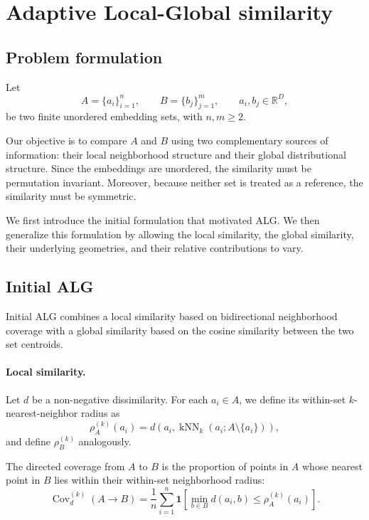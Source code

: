 \documentclass[preprint,12pt]{elsarticle}
\newcommand{\Cov}{\operatorname{Cov}}
\newcommand{\R}{\mathbb{R}}
\newcommand{\ind}{\mathbf{1}}
\begin{document}
\section{Adaptive Local-Global similarity}
\label{sec:method}

\subsection{Problem formulation}

Let
\[
    A=\{a_i\}_{i=1}^{n},
    \qquad
    B=\{b_j\}_{j=1}^{m},
    \qquad
    a_i,b_j\in\R^D,
\]
be two finite unordered embedding sets, with $n,m\geq2$.

Our objective is to compare $A$ and $B$ using two complementary sources of
information: their local neighborhood structure and their global
distributional structure. Since the embeddings are unordered, the similarity
must be permutation invariant. Moreover, because neither set is treated as a
reference, the similarity must be symmetric.

We first introduce the initial formulation that motivated ALG. We then
generalize this formulation by allowing the local similarity, the global
similarity, their underlying geometries, and their relative contributions to
vary.

\subsection{Initial ALG}

Initial ALG combines a local similarity based on bidirectional neighborhood
coverage with a global similarity based on the cosine similarity between the
two set centroids.

\paragraph{Local similarity.}

Let $d$ be a non-negative dissimilarity. For each $a_i\in A$, we define its
within-set $k$-nearest-neighbor radius as
\begin{equation}
\rho_A^{(k)}(a_i)
=
d\!\left(
a_i,
\operatorname{kNN}_k(a_i;A\setminus\{a_i\})
\right),
\label{eq:radius}
\end{equation}
and define $\rho_B^{(k)}$ analogously.

The directed coverage from $A$ to $B$ is the proportion of points in $A$
whose nearest point in $B$ lies within their within-set neighborhood radius:
\begin{equation}
\Cov_d^{(k)}(A\!\to\!B)
=
\frac{1}{n}
\sum_{i=1}^{n}
\ind\!\left[
\min_{b\in B}d(a_i,b)
\leq
\rho_A^{(k)}(a_i)
\right].
\label{eq:directed-coverage}
\end{equation}
\end{document}
